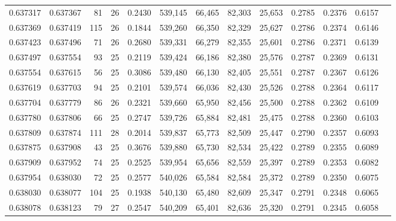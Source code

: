 \begin{tabular}{rrrrrrrrrrrrr}
0.637317 & 0.637367 &  81 &  26 &                                     0.2430 & 539,145 &  66,465 &  82,303 &  25,653 & 0.2785 & 0.2376 & 0.6157 \\
0.637369 & 0.637419 & 115 &  26 &                                     0.1844 & 539,260 &  66,350 &  82,329 &  25,627 & 0.2786 & 0.2374 & 0.6146 \\
0.637423 & 0.637496 &  71 &  26 &                                     0.2680 & 539,331 &  66,279 &  82,355 &  25,601 & 0.2786 & 0.2371 & 0.6139 \\
0.637497 & 0.637554 &  93 &  25 &                                     0.2119 & 539,424 &  66,186 &  82,380 &  25,576 & 0.2787 & 0.2369 & 0.6131 \\
0.637554 & 0.637615 &  56 &  25 &                                     0.3086 & 539,480 &  66,130 &  82,405 &  25,551 & 0.2787 & 0.2367 & 0.6126 \\
0.637619 & 0.637703 &  94 &  25 &                                     0.2101 & 539,574 &  66,036 &  82,430 &  25,526 & 0.2788 & 0.2364 & 0.6117 \\
0.637704 & 0.637779 &  86 &  26 &                                     0.2321 & 539,660 &  65,950 &  82,456 &  25,500 & 0.2788 & 0.2362 & 0.6109 \\
0.637780 & 0.637806 &  66 &  25 &                                     0.2747 & 539,726 &  65,884 &  82,481 &  25,475 & 0.2788 & 0.2360 & 0.6103 \\
0.637809 & 0.637874 & 111 &  28 &                                     0.2014 & 539,837 &  65,773 &  82,509 &  25,447 & 0.2790 & 0.2357 & 0.6093 \\
0.637875 & 0.637908 &  43 &  25 &                                     0.3676 & 539,880 &  65,730 &  82,534 &  25,422 & 0.2789 & 0.2355 & 0.6089 \\
0.637909 & 0.637952 &  74 &  25 &                                     0.2525 & 539,954 &  65,656 &  82,559 &  25,397 & 0.2789 & 0.2353 & 0.6082 \\
0.637954 & 0.638030 &  72 &  25 &                                     0.2577 & 540,026 &  65,584 &  82,584 &  25,372 & 0.2789 & 0.2350 & 0.6075 \\
0.638030 & 0.638077 & 104 &  25 &                                     0.1938 & 540,130 &  65,480 &  82,609 &  25,347 & 0.2791 & 0.2348 & 0.6065 \\
0.638078 & 0.638123 &  79 &  27 &                                     0.2547 & 540,209 &  65,401 &  82,636 &  25,320 & 0.2791 & 0.2345 & 0.6058 \\

\end{tabular}
